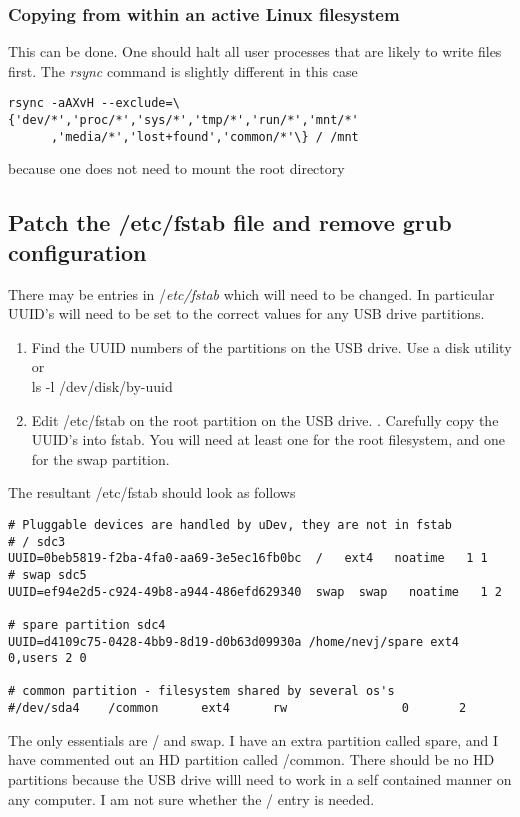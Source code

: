 \documentclass{article}  %
\begin{document}
\subsubsection{Copying from within an active Linux filesystem}
This can be done. One should halt all user processes that are likely to write files first. The {\em rsync} command is slightly different in this case
\begin{verbatim}
rsync -aAXvH --exclude=\{'dev/*','proc/*','sys/*','tmp/*','run/*','mnt/*'
      ,'media/*','lost+found','common/*'\} / /mnt 
\end{verbatim}
because one does not need to mount the root directory

\subsection{Patch the /etc/fstab file and remove grub configuration}
There may be entries in {/\em etc/fstab} which will need to be changed. In particular UUID's will need to be set to the correct values for any USB drive partitions. 
\begin{enumerate}
\item Find the UUID numbers of the partitions on the USB drive. Use a disk utility or \\
  ls -l /dev/disk/by-uuid
\item Edit /etc/fstab on the root partition on the USB drive. . Carefully copy the UUID's into fstab. You will need at least one for the root filesystem, and one for the swap partition.
\end{enumerate}
 The resultant /etc/fstab should look as follows
\begin{verbatim}
# Pluggable devices are handled by uDev, they are not in fstab
# / sdc3
UUID=0beb5819-f2ba-4fa0-aa69-3e5ec16fb0bc  /   ext4   noatime   1 1 
# swap sdc5
UUID=ef94e2d5-c924-49b8-a944-486efd629340  swap  swap   noatime   1 2 

# spare partition sdc4
UUID=d4109c75-0428-4bb9-8d19-d0b63d09930a /home/nevj/spare ext4 0,users 2 0 

# common partition - filesystem shared by several os's
#/dev/sda4    /common      ext4      rw                0       2
\end{verbatim}
The only essentials are / and swap. I have an extra partition called spare, and I have commented out an HD partition called /common. There should be no HD partitions because the USB drive willl need to work in a self contained manner on any computer. I am not sure whether the / entry is needed.
\end{document}
